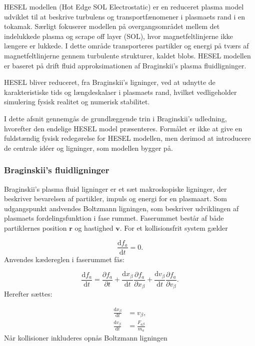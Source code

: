 
HESEL modellen (Hot Edge SOL Electrostatic) er en reduceret plasma model udviklet til at beskrive turbulens og transportfænomener i plasmaets rand i en tokamak.
Særligt fokuserer modellen på overgangsområdet mellem det indelukkede plasma og scrape off layer (SOL), hvor magnetfeltlinjerne ikke længere er lukkede.
I dette område transporteres partikler og energi på tværs af magnetfeltlinjerne gennem turbulente strukturer, kaldet blobs. 
HESEL modellen er baseret på drift fluid approksimationen af Braginskii's plasma fluidligninger\cite{udledning_af_hesel}. 

HESEL bliver reduceret, fra Braginskii's ligninger, 
ved at udnytte de karakteristiske tids og længdeskalaer i plasmaets rand, hvilket vedligeholder simulering fysisk realitet og numerisk stabilitet.

I dette afsnit gennemgås de grundlæggende trin i Braginskii's udledning, hvorefter den endelige HESEL model præsenteres.
Formålet er ikke at give en fuldstændig fysisk redegørelse for HESEL modellen, men derimod at introducere de centrale idéer og ligninger, som modellen bygger på.

\subsubsection{Braginskii's fluidligninger}
Braginskii's plasma fluid ligninger er et sæt makroskopiske ligninger, der beskriver bevarelsen af partikler, impuls og energi for en plasmaart.
Som udgangspunkt andvendes Boltzmann ligningen, som beskriver udviklingen af plasmaets fordelingsfunktion i fase rummet.
Faserummet består af både partiklernes position $\mathbf{r}$ og hastighed $\mathbf{v}$. For et kollisionsfrit system gælder

\begin{equation*}
    \frac{\mathrm{d}f_a}{\mathrm{d}t}=0.
\end{equation*}
Anvendes kædereglen i faserummet fås:

\begin{equation*}
    \frac{\mathrm{d}f_a}{\mathrm{d}t} = \frac{\partial f_a}{\partial t} + \frac{\mathrm{d}x_\beta}{\mathrm{d}t} \frac{\partial f_a}{\partial x_\beta}
    + \frac{\mathrm{d}v_\beta}{\mathrm{d}t} \frac{\partial f_a}{\partial v_\beta}.
\end{equation*}
Herefter sættes:

\begin{align*}
    \frac{\mathrm{d}x_\beta}{\mathrm{d}t} &= v_\beta, \\
    \frac{\mathrm{d}v_\beta}{\mathrm{d}t} &= \frac{F_{a\beta}}{m_a}
\end{align*}
Når kollisioner inkluderes opnås Boltzmann ligningen

